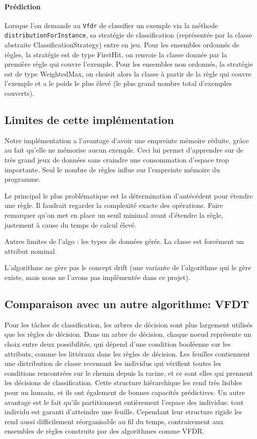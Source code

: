         \paragraph{Prédiction} Lorsque l’on demande au \texttt{Vfdr} de classifier un exemple via la méthode \texttt{distributionForInstance}, sa stratégie de classification (représentée par la classe abstraite ClassificationStrategy) entre en jeu. Pour les ensembles ordonnés de règles, la stratégie est de type FirstHit, on renvoie la classe donnée par la première règle qui couvre l’exemple. Pour les ensembles non ordonnés, la stratégie est de type WeightedMax, on choisit alors la classe à partir de la règle qui couvre l’exemple et a le poids le plus élevé (le plus grand nombre total d’exemples couverts).

    \subsection{Limites de cette implémentation}

        Notre implémentation a l'avantage d'avoir une empreinte mémoire réduite, grâce au fait qu'elle ne mémorise aucun exemple. Ceci lui permet d'apprendre sur de très grand jeux de données sans craindre une consommation d'espace trop importante. Seul le nombre de règles influe sur l'empreinte mémoire du programme.

        Le principal le plus problématique est la détermination d’antécédent pour étendre une règle. Il faudrait regarder la complexité exacte des opérations. Faire remarquer qu’on met en place un seuil minimal avant d’étendre la règle, justement à cause du temps de calcul élevé.
        
        Autres limites de l’algo : les types de données gérés. La classe est forcément un attribut nominal.
        
        L’algorithme ne gère pas le concept drift (une variante de l’algorithme qui le gère existe, mais nous ne l’avons pas implémentée dans ce projet).

    \subsection{Comparaison avec un autre algorithme: VFDT}

        Pour les tâches de classification, les arbres de décision sont plus largement utilisés que les règles de décision. Dans un arbre de décision, chaque noeud représente un choix entre deux possibilités, qui dépend d'une condition booléenne sur les attributs, comme les littéraux dans les règles de décision. Les feuilles contiennent une distribution de classe recensant les individus qui vérifient toutes les conditions rencontrées sur le chemin depuis la racine, et ce sont elles qui prennent les décisions de classification. Cette structure hiérarchique les rend très lisibles pour un humain, et ils ont également de bonnes capacités prédictives. Un autre avantage est le fait qu'ils partitionnent entièrement l'espace des individus: tout individu est garanti d'atteindre une feuille. Cependant leur structure rigide les rend aussi difficilement réorganisable au fil du temps, contrairement aux ensembles de règles construits par des algorithmes comme VFDR.
        
